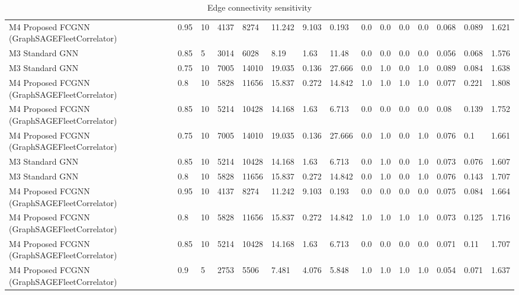 \begin{table}[t]
\begin{tabular}{lllllllllllllll}
M4 Proposed FCGNN (GraphSAGEFleetCorrelator) & 0.95 & 10 & 4137 & 8274 & 11.242 & 9.103 & 0.193 & 0.0 & 0.0 & 0.0 & 0.0 & 0.068 & 0.089 & 1.621 \\
M3 Standard GNN & 0.85 & 5 & 3014 & 6028 & 8.19 & 1.63 & 11.48 & 0.0 & 0.0 & 0.0 & 0.0 & 0.056 & 0.068 & 1.576 \\
M3 Standard GNN & 0.75 & 10 & 7005 & 14010 & 19.035 & 0.136 & 27.666 & 0.0 & 1.0 & 0.0 & 1.0 & 0.089 & 0.084 & 1.638 \\
M4 Proposed FCGNN (GraphSAGEFleetCorrelator) & 0.8 & 10 & 5828 & 11656 & 15.837 & 0.272 & 14.842 & 1.0 & 1.0 & 1.0 & 1.0 & 0.077 & 0.221 & 1.808 \\
M4 Proposed FCGNN (GraphSAGEFleetCorrelator) & 0.85 & 10 & 5214 & 10428 & 14.168 & 1.63 & 6.713 & 0.0 & 0.0 & 0.0 & 0.0 & 0.08 & 0.139 & 1.752 \\
M4 Proposed FCGNN (GraphSAGEFleetCorrelator) & 0.75 & 10 & 7005 & 14010 & 19.035 & 0.136 & 27.666 & 0.0 & 1.0 & 0.0 & 1.0 & 0.076 & 0.1 & 1.661 \\
M3 Standard GNN & 0.85 & 10 & 5214 & 10428 & 14.168 & 1.63 & 6.713 & 0.0 & 1.0 & 0.0 & 1.0 & 0.073 & 0.076 & 1.607 \\
M3 Standard GNN & 0.8 & 10 & 5828 & 11656 & 15.837 & 0.272 & 14.842 & 0.0 & 1.0 & 0.0 & 1.0 & 0.076 & 0.143 & 1.707 \\
M4 Proposed FCGNN (GraphSAGEFleetCorrelator) & 0.95 & 10 & 4137 & 8274 & 11.242 & 9.103 & 0.193 & 0.0 & 0.0 & 0.0 & 0.0 & 0.075 & 0.084 & 1.664 \\
M4 Proposed FCGNN (GraphSAGEFleetCorrelator) & 0.8 & 10 & 5828 & 11656 & 15.837 & 0.272 & 14.842 & 1.0 & 1.0 & 1.0 & 1.0 & 0.073 & 0.125 & 1.716 \\
M4 Proposed FCGNN (GraphSAGEFleetCorrelator) & 0.85 & 10 & 5214 & 10428 & 14.168 & 1.63 & 6.713 & 0.0 & 0.0 & 0.0 & 0.0 & 0.071 & 0.11 & 1.707 \\
M4 Proposed FCGNN (GraphSAGEFleetCorrelator) & 0.9 & 5 & 2753 & 5506 & 7.481 & 4.076 & 5.848 & 1.0 & 1.0 & 1.0 & 1.0 & 0.054 & 0.071 & 1.637 \\
\bottomrule
\end{tabular}
\caption{Edge connectivity sensitivity}
\label{tab:edge_sensitivity}
\end{table}
